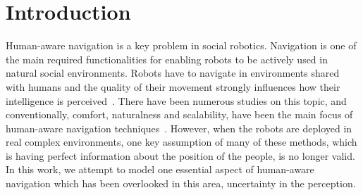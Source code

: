 \section{Introduction}


Human-aware navigation is a key problem in social robotics. Navigation is one of the main required functionalities for enabling robots to be actively used in natural social environments. %
Robots have to navigate in environments shared with humans and the quality of their movement strongly influences how their intelligence is perceived~\cite{Althaus2004}. There have been numerous studies on this topic, and conventionally, comfort, naturalness and scalability, have been the main focus of human-aware navigation techniques~\cite{Kruse2013}. However, when the robots are deployed in real complex environments, one key assumption of many of these methods, which is having perfect information about the position of the people, is no longer valid. In this work, we attempt to model one essential aspect of human-aware navigation which has been overlooked in this area, uncertainty in the perception.


